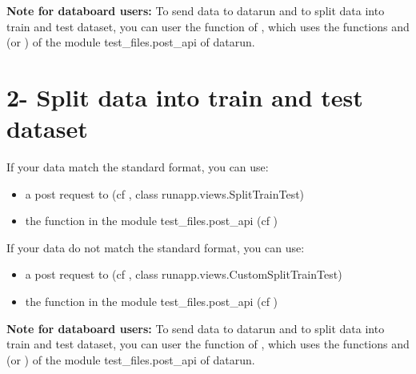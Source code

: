 \documentclass[letterpaper,10pt,english]{sphinxmanual}
\begin{document}
\textbf{Note for databoard users:}
To send data to datarun and to split data into train and test dataset, you can user the function  of , which uses the functions  and  (or ) of the module test\_files.post\_api of datarun.


\section{2- Split data into train and test dataset}
\label{modules/workflow:split-data-into-train-and-test-dataset}
If your data match the standard format, you can use:
\begin{itemize}
\item {} 
a post request to  (cf {\hyperref[modules/views:requestsdirect]{}}, class runapp.views.SplitTrainTest)

\item {} 
the  function in the module test\_files.post\_api (cf {\hyperref[modules/views:requestsmodule]{}})

\end{itemize}

If your data do not match the standard format, you can use:
\begin{itemize}
\item {} 
a post request to  (cf {\hyperref[modules/views:requestsdirect]{}}, class runapp.views.CustomSplitTrainTest)

\item {} 
the  function in the module test\_files.post\_api (cf {\hyperref[modules/views:requestsmodule]{}})

\end{itemize}

\textbf{Note for databoard users:}
To send data to datarun and to split data into train and test dataset, you can user the function  of , which uses the functions  and  (or ) of the module test\_files.post\_api of datarun.
\end{document}
